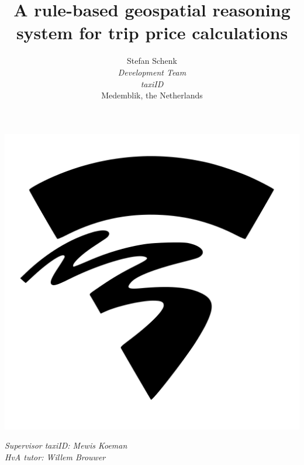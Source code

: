 \begin{titlepage}
  \title{A rule-based geospatial reasoning system for trip price calculations\\
    \vspace*{6mm}
  }

  \author{Stefan Schenk \\
    \textit{Development Team} \\
    \textit{taxiID} \\
    Medemblik, the Netherlands
  }
  \maketitle

  \vfill
  \centering
  \includegraphics[width=.5\linewidth]{res/Hogeschool_van_amsterdam_logo_svg.png}
  \vfill

  \pagestyle{empty}
  \textit{
    Supervisor taxiID: Mewis Koeman \\
    HvA tutor:  Willem Brouwer
  }
\end{titlepage}
\clearpage

